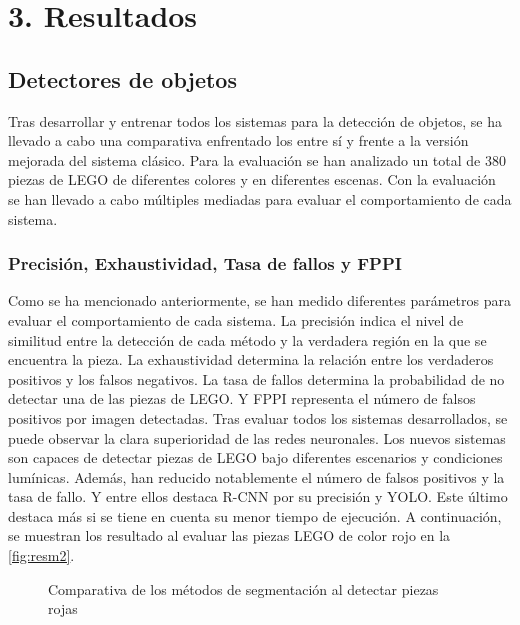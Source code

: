 {\section*{3. Resultados}
\subsection*{Detectores de objetos}
Tras desarrollar y entrenar todos los sistemas para la detección de objetos, se ha llevado a cabo una comparativa enfrentado los entre sí y frente a la versión mejorada del sistema clásico. Para la evaluación se han analizado un total de 380 piezas de LEGO de diferentes colores y en diferentes escenas. Con la evaluación se han llevado a cabo múltiples mediadas para evaluar el comportamiento de cada sistema.

\subsubsection*{Precisión, Exhaustividad, Tasa de fallos y FPPI}
Como se ha mencionado anteriormente, se han medido diferentes parámetros para evaluar el comportamiento de cada sistema. La precisión indica el nivel de similitud entre la detección de cada método y la verdadera región en la que se encuentra la pieza. La exhaustividad determina la relación entre los verdaderos positivos y los falsos negativos. La tasa de fallos determina la probabilidad de no detectar una de las piezas de LEGO. Y FPPI representa el número de falsos positivos por imagen detectadas. Tras evaluar todos los sistemas desarrollados, se puede observar la clara superioridad de las redes neuronales. Los nuevos sistemas son capaces de detectar piezas de LEGO bajo diferentes escenarios y condiciones lumínicas. Además, han reducido notablemente el número de falsos positivos y la tasa de fallo. Y entre ellos destaca R-CNN por su precisión y YOLO. Este último destaca más si se tiene en cuenta su menor tiempo de ejecución. A continuación, se muestran los resultado al evaluar las piezas LEGO de color rojo en la \autoref{fig:resm2}.

\begin{figure}[ht]  %
\vspace{-10pt}
  \hfill	
\caption{Comparativa de los métodos de segmentación al detectar piezas rojas}
\label{fig:resm2}
\end{figure}

}
